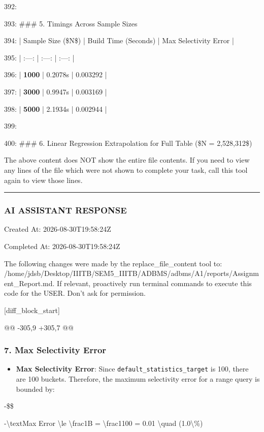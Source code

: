 \documentclass[11pt,a4paper]{article}
\begin{document}
{392:

393: \#\#\# 5. Timings Across Sample Sizes

394: | Sample Size (\$N\$) | Build Time (Seconds) | Max Selectivity Error |

395: | :---: | :---: | :---: |

396: | \textbf{1000} | 0.2078s | 0.003292 |

397: | \textbf{3000} | 0.9947s | 0.003169 |

398: | \textbf{5000} | 2.1934s | 0.002944 |

399:

400: \#\#\# 6. Linear Regression Extrapolation for Full Table (\$N = 2,528,312\$)

The above content does NOT show the entire file contents. If you need to view any lines of the file which were not shown to complete your task, call this tool again to view those lines.


\hrule

\subsubsection{AI ASSISTANT RESPONSE}

Created At: 2026-08-30T19:58:24Z

Completed At: 2026-08-30T19:58:24Z

The following changes were made by the replace\_file\_content tool to: /home/jdsb/Desktop/IIITB/SEM5\_IIITB/ADBMS/adbms/A1/reports/Assignment\_Report.md. If relevant, proactively run terminal commands to execute this code for the USER. Don't ask for permission.

[diff\_block\_start]

@@ -305,9 +305,7 @@

\subsubsection{7. Max Selectivity Error}
\begin{itemize}
\item \textbf{Max Selectivity Error}: Since \texttt{default\_statistics\_target} is 100, there are 100 buckets. Therefore, the maximum selectivity error for a range query is bounded by:
\end{itemize}

-\$\$

-\textbackslash{}text{Max Error} \textbackslash{}le \textbackslash{}frac{1}{B} = \textbackslash{}frac{1}{100} = 0.01 \textbackslash{}quad (1.0\textbackslash{}\%)

}
\end{document}

